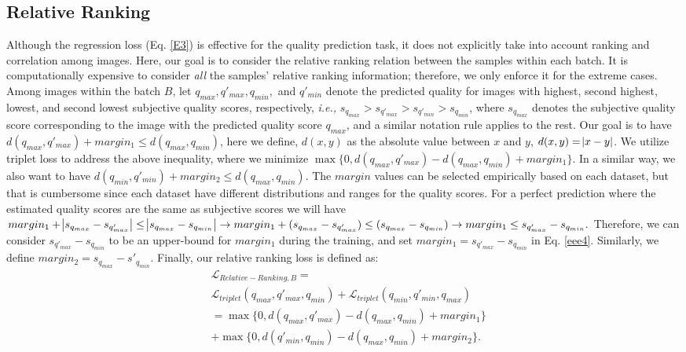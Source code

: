 \documentclass[10pt,twocolumn,letterpaper]{article}
\begin{document}
\subsection{Relative Ranking}
\label{S3.4}
Although the regression loss (Eq. \ref{E3}) is effective for the quality prediction task, it does not explicitly take into account ranking and correlation among images.
Here, our goal is to consider the relative ranking relation between the samples within each batch.
It is computationally expensive to consider \textit{all} the samples' relative ranking information; therefore, we only enforce it for the extreme cases.
 Among  images within the batch  $B$, let $q_{max},q'_{max},q_{min},$ and $q'_{min}$ denote the predicted quality for images with highest, second highest, lowest, and second lowest subjective quality scores, respectively, \textit{i.e.,}  $s_{q_{max}}>s_{q'_{max}}>s_{q'_{min}}>s_{q_{min}}$, where $s_{q_{max}}$ denotes the subjective quality score corresponding to the image with the predicted quality score $q_{max}$, and a similar notation rule applies to the rest.
Our goal is to have $d(q_{max},q'_{max})+margin_1\leq d(q_{max},q_{min})$, here we define, $d(x,y)$ as the absolute value between $x$ and $y$,  $d(x,y)=\abs{x-y}$. 
We utilize triplet loss to address the above inequality, where we minimize $\max\{0,d(q_{max},q'_{max})-d(q_{max},q_{min})+margin_{1}\}$.
In a similar way, we also want to have $d(q_{min},q'_{min})+margin_2 \leq d(q_{max},q_{min})$.
The $margin$ values can be selected empirically based on each dataset, but that is cumbersome since each dataset have different distributions and ranges for the quality scores.
For a perfect prediction where the estimated quality scores are the same as subjective scores we will have $margin_1+\abs{s_{q_{max}}-s_{q'_{max}}}\leq \abs{s_{q_{max}}-s_{q_{min}}} \rightarrow margin_1 +  (s_{q_{max}}-s_{q'_{max}}) \leq (s_{q_{max}}-s_{q_{min}})  \rightarrow margin_1 \leq s_{q'_{max}}  -s_{q_{min}}.$
Therefore, we can consider $s_{q'_{max}}  -s_{q_{min}}$ to be an upper-bound for $margin_1$ during the training, and set  $margin_1 = s_{q'_{max}}  -s_{q_{min}}$ in Eq. \ref{eee4}.
Similarly,  we define $ margin_2=s_{q_{max}}-s'_{q_{min}}$. 
Finally, our relative ranking loss is defined as:
\vspace{-0.2 cm}
\begin{equation}
  \begin{aligned}
     & \mathcal{L}_{Relative-Ranking,B} =\\
     & \mathcal{L}_{triplet}(q_{max},q'_{max},q_{min})+\mathcal{L}_{triplet}(q_{min},q'_{min},q_{max})\\
     & =\max\{0,d(q_{max},q'_{max})-d(q_{max},q_{min})+margin_{1}\}\\   
     & +\max\{0,d(q'_{min},q_{min})-d(q_{max},q_{min})+margin_{2}\}.
    \end{aligned}
    \label{eee4}
\end{equation}
\end{document}
